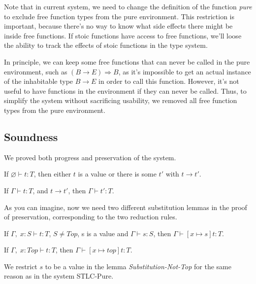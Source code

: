 Note that in current system, we need to change the definition of the
function \emph{pure} to exclude free function types from the pure
environment. This restriction is important, because there's no way to
know what side effects there might be inside free functions. If stoic
functions have access to free functions, we'll loose the ability to
track the effects of stoic functions in the type system.

In principle, we can keep some free functions that can never be called
in the pure environment, such as $(B \to E) \Rightarrow B$, as it's
impossible to get an actual instance of the inhabitable type $B \to E$
in order to call this function. However, it's not useful to have
functions in the environment if they can never be called. Thus, to
simplify the system without sacrificing usability, we removed all free
function types from the pure environment.

\subsection{Soundness}

We proved both progress and preservation of the system.

\begin{theorem}[Progress]
If $\varnothing \vdash t : T$, then either $t$ is a value or there is some
$t'$ with $t \longrightarrow t'$.
\end{theorem}

\begin{theorem}[Preservation]
If $\Gamma \vdash t : T$, and $t \longrightarrow t'$, then $\Gamma
\vdash t' : T$.
\end{theorem}

As you can imagine, now we need two different substitution lemmas in
the proof of preservation, corresponding to the two reduction rules.

\begin{lemma}
  If $\Gamma,\; x:S \vdash t : T$, $S \neq Top$, s is a value and
  $\Gamma \vdash s : S$, then $\Gamma \vdash [x \mapsto s]t : T$.
\end{lemma}

\begin{lemma}
  If $\Gamma,\; x:Top \vdash t : T$, then $\Gamma \vdash [x \mapsto top]t : T$.
\end{lemma}

We restrict $s$ to be a value in the lemma \emph{Substitution-Not-Top}
for the same reason as in the system STLC-Pure.

